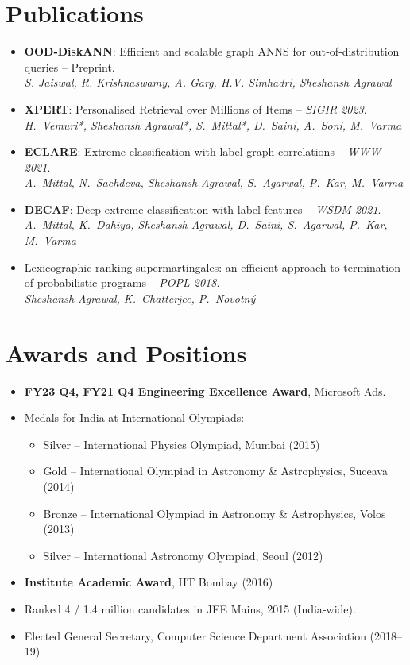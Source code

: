 \documentclass[11pt,a4paper,sans]{moderncv}        %
\begin{document}
\section{Publications}
\begin{itemize}
  \item \textbf{OOD‑DiskANN}: Efficient and scalable graph ANNS for out‑of‑distribution queries -- Preprint.\\
        \textit{S. Jaiswal, R. Krishnaswamy, A. Garg, H.V. Simhadri, Sheshansh Agrawal}
  \item \textbf{XPERT}: Personalised Retrieval over Millions of Items -- \textit{SIGIR 2023}.\\
        \textit{H.~Vemuri*, Sheshansh Agrawal*, S.~Mittal*, D.~Saini, A.~Soni, M.~Varma}
  \item \textbf{ECLARE}: Extreme classification with label graph correlations -- \textit{WWW 2021}.\\
        \textit{A.~Mittal, N.~Sachdeva, Sheshansh Agrawal, S.~Agarwal, P.~Kar, M.~Varma}
  \item \textbf{DECAF}: Deep extreme classification with label features -- \textit{WSDM 2021}.\\
        \textit{A.~Mittal, K.~Dahiya, Sheshansh Agrawal, D.~Saini, S.~Agarwal, P.~Kar, M.~Varma}
  \item Lexicographic ranking supermartingales: an efficient approach to termination of probabilistic programs -- \textit{POPL 2018}.\\
        \textit{Sheshansh Agrawal, K.~Chatterjee, P.~Novotný}
\end{itemize}

\vspace{-5pt}
\section{Awards and Positions}
\begin{itemize}
  \item \textbf{FY23 Q4, FY21 Q4 Engineering Excellence Award}, Microsoft Ads.
  \item Medals for India at International Olympiads:
    \begin{itemize}
      \item Silver -- International Physics Olympiad, Mumbai (2015)
      \item Gold -- International Olympiad in Astronomy \& Astrophysics, Suceava (2014)
      \item Bronze -- International Olympiad in Astronomy \& Astrophysics, Volos (2013)
      \item Silver -- International Astronomy Olympiad, Seoul (2012)
    \end{itemize}
  \item \textbf{Institute Academic Award}, IIT Bombay (2016)
  \item Ranked 4 / 1.4 million candidates in JEE Mains, 2015 (India‑wide).
  \item Elected General Secretary, Computer Science Department Association (2018--19)
\end{itemize}

\end{document}
